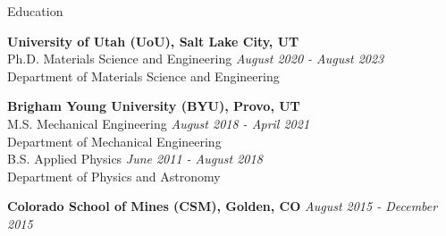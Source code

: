 \documentclass{resume} %
\begin{document}
% 

\begin{rSection}{Education}

{\bf University of Utah (UoU), Salt Lake City, UT}
\\ Ph.D. Materials Science and Engineering \hfill {\em August 2020 - August 2023}
\\ Department of Materials Science and Engineering %

{\bf Brigham Young University (BYU), Provo, UT} 
\\ M.S. Mechanical Engineering \hfill {\em August 2018 - April 2021}
\\ Department of Mechanical Engineering %
\\ B.S. Applied Physics \hfill {\em June 2011 - August 2018}
\\ Department of Physics and Astronomy %

{\bf Colorado School of Mines (CSM), Golden, CO} \hfill {\em August 2015 - December 2015}



\end{rSection}
\end{document}
